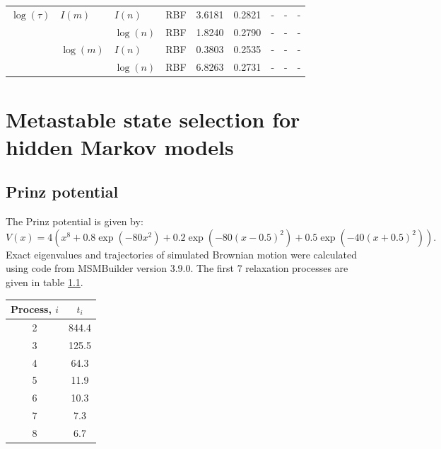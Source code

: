 \begin{table}
\begin{tabularx}{1\textwidth}{|llllrr >{\raggedright\arraybackslash}X>{\raggedright\arraybackslash}X>{\raggedright\arraybackslash}X|}
    $\log({\tau})$ & $I({m})$ & $I({n})$ & RBF &  3.6181 & 0.2821 &           - &           - &            - \\
                   &             & $\log({n})$ & RBF &  1.8240 & 0.2790 &           - &           - &            - \\
                   & $\log({m})$ & $I({n})$ & RBF &  0.3803 & 0.2535 &           - &           - &            - \\
                   &             & $\log({n})$ & RBF &  6.8263 & 0.2731 &           - &           - &            - \\
    \hline
    \end{tabularx}
\end{table}

\chapter{Metastable state selection for hidden Markov models}\label{app:hmm}

\section{Prinz potential}
 The Prinz potential is given by: 
\begin{equation}\label{eqn:prinz_pot}
       V(x) = 4\left(x^8 + 0.8 \exp{\left(-80 x^2\right)} + 0.2 \exp{\left(-80 (x-0.5)^2\right)} + 0.5\exp{\left(-40 (x+0.5)^2\right)}\right).
\end{equation}
Exact eigenvalues and trajectories of simulated Brownian motion were calculated using code from MSMBuilder \cite{beauchampMSMBuilder2ModelingConformational2011} version 3.9.0.  The first $7$ relaxation processes are given in table \ref{tab:prinz_its_exact}. 
\begin{table}
    \centering
    \begin{tabular}{|c|c|}
        \hline
        Process, $i$ & $t_i$ \\
        \hline\hline
         2 & 844.4 \\
         3 & 125.5 \\
         4 & 64.3 \\
         5 & 11.9 \\
         6 & 10.3 \\
         7 & 7.3 \\
         8 & 6.7 \\
         \hline
    \end{tabular}
    \label{tab:prinz_its_exact}
\end{table}

